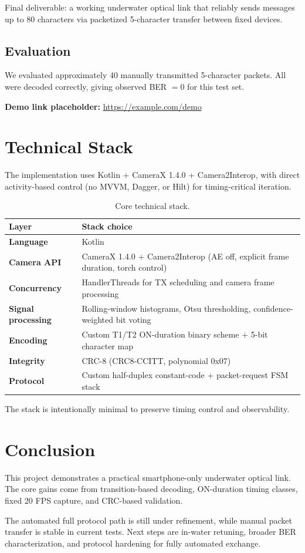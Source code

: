\documentclass[10pt,a4paper]{article}
\begin{document}
Final deliverable: a working underwater optical link that reliably sends messages up to 80 characters via packetized 5-character transfer between fixed devices.

\subsection{Evaluation}
We evaluated approximately 40 manually transmitted 5-character packets. All were decoded correctly, giving observed BER \(= 0\) for this test set.

\textbf{Demo link placeholder:} \href{https://example.com/demo}{https://example.com/demo}

\section{Technical Stack}
The implementation uses Kotlin + CameraX 1.4.0 + Camera2Interop, with direct activity-based control (no MVVM, Dagger, or Hilt) for timing-critical iteration.

\begin{table}[H]
\centering
\caption{Core technical stack.}
\begin{tabularx}{\linewidth}{>{\bfseries}l X}
\toprule
Layer & Stack choice \\
\midrule
Language & Kotlin \\
Camera API & CameraX 1.4.0 + Camera2Interop (AE off, explicit frame duration, torch control) \\
Concurrency & HandlerThreads for TX scheduling and camera frame processing \\
Signal processing & Rolling-window histograms, Otsu thresholding, confidence-weighted bit voting \\
Encoding & Custom T1/T2 ON-duration binary scheme + 5-bit character map \\
Integrity & CRC-8 (CRC8-CCITT, polynomial 0x07) \\
Protocol & Custom half-duplex constant-code + packet-request FSM stack \\
\bottomrule
\end{tabularx}
\end{table}

The stack is intentionally minimal to preserve timing control and observability.

\section{Conclusion}
This project demonstrates a practical smartphone-only underwater optical link. The core gains come from transition-based decoding, ON-duration timing classes, fixed 20 FPS capture, and CRC-based validation.

The automated full protocol path is still under refinement, while manual packet transfer is stable in current tests. Next steps are in-water retuning, broader BER characterization, and protocol hardening for fully automated exchange.
\end{document}
